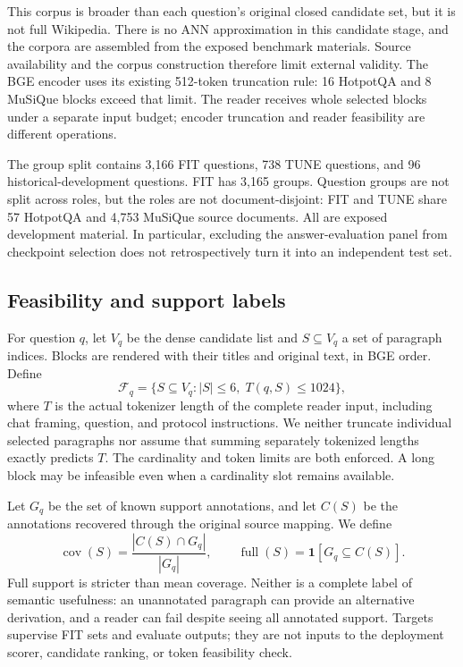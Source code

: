 \documentclass[pdflatex,sn-mathphys-num]{sn-jnl}
\begin{document}
This corpus is broader than each question's original closed candidate set,
but it is not full Wikipedia. There is no ANN approximation in this
candidate stage, and the corpora are assembled from the exposed benchmark
materials. Source availability and the corpus construction therefore limit
external validity. The BGE encoder uses its existing 512-token truncation
rule: 16 HotpotQA and 8 MuSiQue blocks exceed that limit. The reader receives
whole selected blocks under a separate input budget; encoder truncation and
reader feasibility are different operations.

The group split contains 3,166 FIT questions, 738 TUNE questions, and 96
historical-development questions. FIT has 3,165 groups. Question groups are
not split across roles, but the roles are not document-disjoint: FIT and TUNE
share 57 HotpotQA and 4,753 MuSiQue source documents. All are exposed
development material. In particular, excluding the answer-evaluation panel
from checkpoint selection does not retrospectively turn it into an
independent test set.

\subsection{Feasibility and support labels}
For question $q$, let $V_q$ be the dense candidate list and $S\subseteq V_q$
a set of paragraph indices. Blocks are rendered with their titles and
original text, in BGE order. Define
\begin{equation}\label{eq:feasible}
\mathcal F_q=\{S\subseteq V_q:|S|\leq6,\;T(q,S)\leq1024\},
\end{equation}
where $T$ is the actual tokenizer length of the complete reader input,
including chat framing, question, and protocol instructions. We neither
truncate individual selected paragraphs nor assume that summing separately
tokenized lengths exactly predicts $T$. The cardinality and token limits
are both enforced. A long block may be infeasible even when a cardinality
slot remains available.

Let $G_q$ be the set of known support annotations, and let $C(S)$ be the
annotations recovered through the original source mapping. We define
\begin{equation}\label{eq:labels}
\operatorname{cov}(S)=\frac{|C(S)\cap G_q|}{|G_q|},\qquad
\operatorname{full}(S)=\mathbf1[G_q\subseteq C(S)].
\end{equation}
Full support is stricter than mean coverage. Neither is a complete label of
semantic usefulness: an unannotated paragraph can provide an alternative
derivation, and a reader can fail despite seeing all annotated support.
Targets supervise FIT sets and evaluate outputs; they are not inputs to the
deployment scorer, candidate ranking, or token feasibility check.
\end{document}
